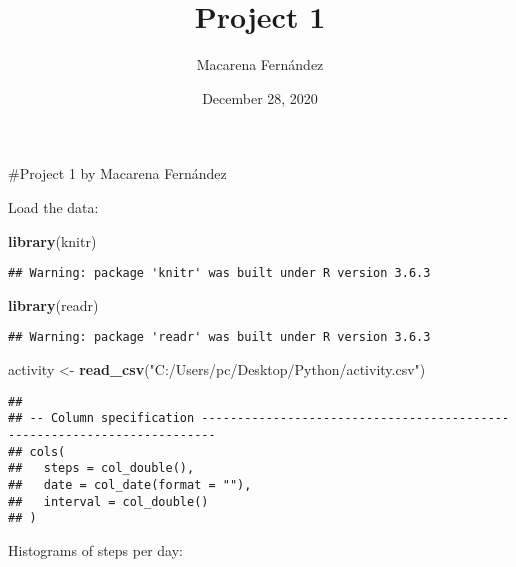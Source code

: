 \documentclass[
]{article}
\title{Project 1}
\author{Macarena Fernández}
\date{December 28, 2020}
\newenvironment{Shaded}{\begin{snugshade}}{\end{snugshade}}
\newcommand{\DataTypeTok}[1]{\textcolor[rgb]{0.13,0.29,0.53}{#1}}
\newcommand{\KeywordTok}[1]{\textcolor[rgb]{0.13,0.29,0.53}{\textbf{#1}}}
\newcommand{\NormalTok}[1]{#1}
\newcommand{\OperatorTok}[1]{\textcolor[rgb]{0.81,0.36,0.00}{\textbf{#1}}}
\newcommand{\OtherTok}[1]{\textcolor[rgb]{0.56,0.35,0.01}{#1}}
\newcommand{\StringTok}[1]{\textcolor[rgb]{0.31,0.60,0.02}{#1}}
\begin{document}
\maketitle

\#Project 1 by Macarena Fernández

Load the data:

\begin{Shaded}
\begin{Highlighting}[]
\KeywordTok{library}\NormalTok{(knitr)}
\end{Highlighting}
\end{Shaded}

\begin{verbatim}
## Warning: package 'knitr' was built under R version 3.6.3
\end{verbatim}

\begin{Shaded}
\begin{Highlighting}[]
\KeywordTok{library}\NormalTok{(readr)}
\end{Highlighting}
\end{Shaded}

\begin{verbatim}
## Warning: package 'readr' was built under R version 3.6.3
\end{verbatim}

\begin{Shaded}
\begin{Highlighting}[]
\NormalTok{activity <-}\StringTok{ }\KeywordTok{read_csv}\NormalTok{(}\StringTok{"C:/Users/pc/Desktop/Python/activity.csv"}\NormalTok{)}
\end{Highlighting}
\end{Shaded}

\begin{verbatim}
## 
## -- Column specification ------------------------------------------------------------------------
## cols(
##   steps = col_double(),
##   date = col_date(format = ""),
##   interval = col_double()
## )
\end{verbatim}

Histograms of steps per day:

\begin{Shaded}
\end{Shaded}
\end{document}
